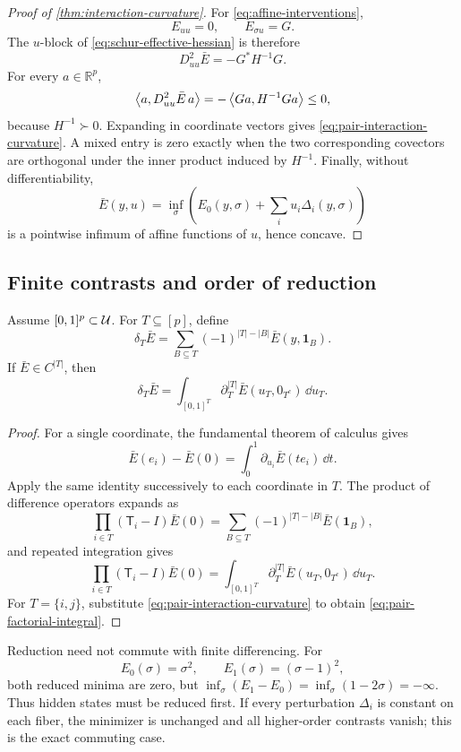 \begin{proof}[Proof of \cref{thm:interaction-curvature}]
For \cref{eq:affine-interventions},
\[
  E_{uu}=0,
  \qquad
  E_{\sigma u}=G.
\]
The \(u\)-block of \cref{eq:schur-effective-hessian} is therefore
\[
  D^2_{uu}\bar E=-G^*H^{-1}G.
\]
For every \(a\in\mathbb R^p\),
\[
  \left\langle a,D^2_{uu}\bar E\,a\right\rangle
  =-\left\langle Ga,H^{-1}Ga\right\rangle\le0,
\]
because \(H^{-1}\succ0\).  Expanding in coordinate vectors gives
\cref{eq:pair-interaction-curvature}.  A mixed entry is zero exactly when the
two corresponding covectors are orthogonal under the inner product induced by
\(H^{-1}\).  Finally, without differentiability,
\[
  \bar E(y,u)=\inf_\sigma
  \left(E_0(y,\sigma)+\sum_i u_i\Delta_i(y,\sigma)\right)
\]
is a pointwise infimum of affine functions of \(u\), hence concave.
\end{proof}

\subsection{Finite contrasts and order of reduction}
\label{app:finite-contrasts}

\begin{corollary}
\label{cor:factorial-contrast}
Assume \([0,1]^p\subset\mathcal U\).  For \(T\subseteq[p]\), define
\begin{equation}
  \delta_T\bar E
  =\sum_{B\subseteq T}(-1)^{|T|-|B|}
  \bar E(y,\mathbf1_B).
  \label{eq:factorial-contrast}
\end{equation}
If \(\bar E\in C^{|T|}\), then
\begin{equation}
  \delta_T\bar E
  =\int_{[0,1]^T}
  \partial_T^{|T|}\bar E(u_T,0_{T^c})\,\dd u_T.
  \label{eq:factorial-integral}
\end{equation}
\end{corollary}

\begin{proof}
For a single coordinate, the fundamental theorem of calculus gives
\[
  \bar E(e_i)-\bar E(0)
  =\int_0^1\partial_{u_i}\bar E(t e_i)\,\dd t.
\]
Apply the same identity successively to each coordinate in \(T\).  The product
of difference operators expands as
\[
  \prod_{i\in T}(\mathsf T_i-I)\bar E(0)
  =\sum_{B\subseteq T}(-1)^{|T|-|B|}\bar E(\mathbf1_B),
\]
and repeated integration gives
\[
  \prod_{i\in T}(\mathsf T_i-I)\bar E(0)
  =\int_{[0,1]^T}\partial_T^{|T|}\bar E(u_T,0_{T^c})\,\dd u_T.
\]
For \(T=\{i,j\}\), substitute
\cref{eq:pair-interaction-curvature} to obtain
\cref{eq:pair-factorial-integral}.
\end{proof}

Reduction need not commute with finite differencing.  For
\[
  E_0(\sigma)=\sigma^2,\qquad E_1(\sigma)=(\sigma-1)^2,
\]
both reduced minima are zero, but
\(\inf_\sigma(E_1-E_0)=\inf_\sigma(1-2\sigma)=-\infty\).
Thus hidden states must be reduced first.  If every perturbation
\(\Delta_i\) is constant on each fiber, the minimizer is unchanged and all
higher-order contrasts vanish; this is the exact commuting case.
